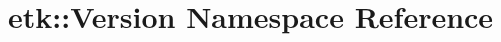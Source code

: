 \hypertarget{namespaceetk_1_1_version}{\section{etk\-:\-:Version Namespace Reference}
\label{namespaceetk_1_1_version}
}
